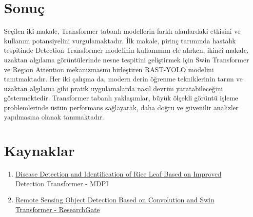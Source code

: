 \documentclass[a4paper,12pt]{article}
\begin{document}
\section{Sonuç}
Seçilen iki makale, Transformer tabanlı modellerin farklı alanlardaki etkisini ve kullanım potansiyelini vurgulamaktadır. İlk makale, pirinç tarımında hastalık tespitinde Detection Transformer modelinin kullanımını ele alırken, ikinci makale, uzaktan algılama görüntülerinde nesne tespitini geliştirmek için Swin Transformer ve Region Attention mekanizmasını birleştiren RAST-YOLO modelini tanıtmaktadır. Her iki çalışma da, modern derin öğrenme tekniklerinin tarım ve uzaktan algılama gibi pratik uygulamalarda nasıl devrim yaratabileceğini göstermektedir. Transformer tabanlı yaklaşımlar, büyük ölçekli görüntü işleme problemlerinde üstün performans sağlayarak, daha doğru ve güvenilir analizler yapılmasına olanak tanımaktadır.

\section{Kaynaklar}
\begin{enumerate}
    \item \href{https://www.mdpi.com/2077-0472/13/7/1361}{Disease Detection and Identification of Rice Leaf Based on Improved Detection Transformer - MDPI}
    \item \href{https://www.researchgate.net/publication/370080729_Remote_Sensing_Object_Detection_Based_on_Convolution_and_Swin_Transformer}{Remote Sensing Object Detection Based on Convolution and Swin Transformer - ResearchGate}
\end{enumerate}
\end{document}
